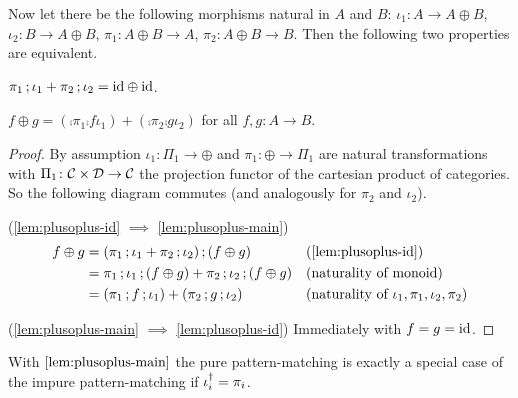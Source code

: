 \documentclass[runningheads,envcountsame]{llncs}
\begin{document}
\begin{lemma}
Now let there be the following morphisms natural in $A$ and $B$: $\iota_1\colon A \to A \oplus B$, $\iota_2\colon B \to A \oplus B$, $\pi_1\colon A \oplus B \to A$, $\pi_2\colon A \oplus B \to B$. Then the following two properties are equivalent.
\begin{lemmalist}
    \item $\comp{\pi_1}{\iota_1} + \comp{\pi_2}{\iota_2} = \id \oplus \id$. \label{lem:plusoplus-id}
    \item $f \oplus g = (\comp{\pi_1}{\comp{f}{\iota_1}}) + (\comp{\pi_2}{\comp{g}{\iota_2}})$ for all $f, g\colon A \to B$. \label{lem:plusoplus-main}
\end{lemmalist}
\end{lemma}
\begin{proof}
    By assumption $\iota_1\colon \Pi_1 \to \oplus$ and $\pi_1\colon \oplus \to \Pi_1$ are natural transformations with $\Pi_1\colon \mathcal{C} \times \mathcal{D} \to \mathcal{C}$ the projection functor of the cartesian product of categories. So the following diagram commutes (and analogously for $\pi_2$ and $\iota_2$).
    \begin{center}
    \end{center}

    (\ref{lem:plusoplus-id} $\implies$ \ref{lem:plusoplus-main}) \begin{align}
        f \oplus g &= \comp{(\comp{\pi_1}{\iota_1} + \comp{\pi_2}{\iota_2})}{(f \oplus g)} &&\text{(\ref{lem:plusoplus-id})} \\
                   &= \comp{\comp{\pi_1}{\iota_1}}{(f \oplus g)} + \comp{\comp{\pi_2}{\iota_2}}{(f \oplus g)} &&\text{(naturality of monoid)} \\
                   &= (\comp{\pi_1}{\comp{f}{\iota_1}}) + (\comp{\pi_2}{\comp{g}{\iota_2}}) &&\text{(naturality of $\iota_1, \pi_1, \iota_2, \pi_2$)}
    \end{align}
    
    (\ref{lem:plusoplus-main} $\implies$ \ref{lem:plusoplus-id}) Immediately with $f = g = \id$.
\end{proof}

With $\ref{lem:plusoplus-main}$ the pure pattern-matching is exactly a special case of the impure pattern-matching if $\rev{\iota_i} = \pi_i$.
\end{document}
